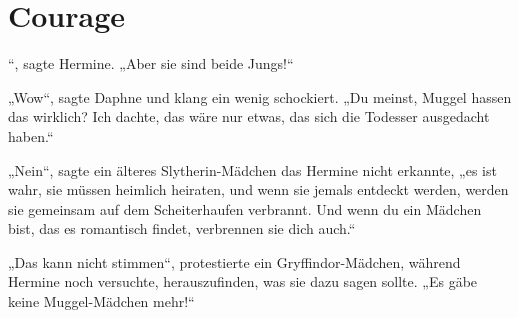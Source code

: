 \chapter{Courage}

“, sagte Hermine.
„Aber sie sind beide Jungs!“

\hplettrineextrapara
„Wow“, sagte Daphne und klang ein wenig schockiert.
„Du meinst, Muggel hassen das wirklich? Ich dachte, das wäre nur etwas, das sich die Todesser ausgedacht haben.“

„Nein“, sagte ein älteres Slytherin-Mädchen das Hermine nicht erkannte, „es ist wahr, sie müssen heimlich heiraten, und wenn sie jemals entdeckt werden, werden sie gemeinsam auf dem Scheiterhaufen verbrannt. Und wenn du ein Mädchen bist, das es romantisch findet, verbrennen sie dich auch.“

„Das kann nicht stimmen“, protestierte ein Gryffindor-Mädchen, während Hermine noch versuchte, herauszufinden, was sie dazu sagen sollte.
„Es gäbe keine Muggel-Mädchen mehr!“

